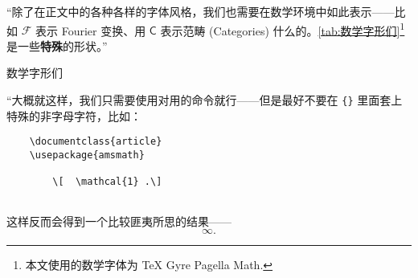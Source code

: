 “除了在正文中的各种各样的字体风格，我们也需要在数学环境中如此表示——比如 $\mathcal{F}$ 表示 Fourier 变换、用 $\mathsf{C}$ 表示范畴 (Categories) 什么的。\autoref{tab:数学字形们}\footnote{本文使用的数学字体为 \TeX{} Gyre Pagella Math.} 是一些\textbf{特殊}的形状。”

\begin{table}[h]
    \centering
    \caption{数学字形们}
    \label{tab:数学字形们}
\end{table}

“大概就这样，我们只需要使用对用的命令就行——但是最好不要在 \verb"{}" 里面套上特殊的非字母字符，比如：


\begin{lstlisting}
    \documentclass{article}
    \usepackage{amsmath}
    
        \[  \mathcal{1} .\]
    
\end{lstlisting}

这样反而会得到一个比较匪夷所思的结果——
\[
    \mathord\infty
    .\]

